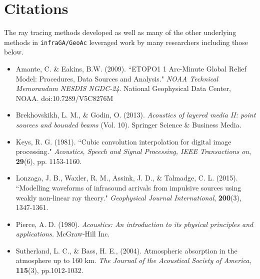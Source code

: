 \documentclass[10pt]{article}
\begin{document}
\section{Citations}
The ray tracing methods developed as well as many of the other underlying methods in \verb=infraGA/GeoAc= leveraged work by many researchers including those below.
\begin{itemize}
  \item Amante, C. \& Eakins, B.W. (2009). ``ETOPO1 1 Arc-Minute Global Relief Model: Procedures, Data Sources and Analysis."  \textit{NOAA Technical Memorandum NESDIS NGDC-24}. National Geophysical Data Center, NOAA. doi:10.7289/V5C8276M
  \item Brekhovskikh, L. M., \& Godin, O. (2013).  \textit{Acoustics of layered media II: point sources and bounded beams} (Vol. 10). Springer Science \& Business Media.
  \item Keys, R. G. (1981). ``Cubic convolution interpolation for digital image processing." \textit{Acoustics, Speech and Signal Processing, IEEE Transactions on}, \textbf{29}(6), pp. 1153-1160.
  \item Lonzaga, J. B., Waxler, R. M., Assink, J. D., \& Talmadge, C. L. (2015). ``Modelling waveforms of infrasound arrivals from impulsive sources using weakly non-linear ray theory." \textit{Geophysical Journal International}, \textbf{200}(3), 1347-1361.
  \item Pierce, A. D. (1980).  \textit{Acoustics: An introduction to its physical principles and applications.}  McGraw-Hill Inc. 
  \item Sutherland, L. C., \& Bass, H. E., (2004). Atmospheric absorption in the atmosphere up to 160 km. \textit{The Journal of the Acoustical Society of America}, \textbf{115}(3), pp.1012-1032.

 \end{itemize}
\end{document}
